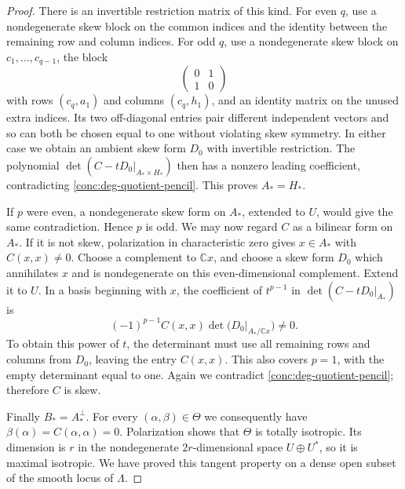 \begin{proof}
There is an invertible restriction matrix of this kind.  For
even \(q\), use a nondegenerate skew block on the common
indices and the identity between the remaining row and column
indices.  For odd \(q\), use a nondegenerate skew block on
\(c_1,\ldots,c_{q-1}\), the block
\[
 \begin{pmatrix}0&1\\1&0\end{pmatrix}
\]
with rows \((c_q,a_1)\) and columns \((c_q,h_1)\), and an
identity matrix on the unused extra indices.  Its two off-diagonal
entries pair different independent vectors and so can both be
chosen equal to one without violating skew symmetry.  In either
case we obtain an ambient skew form \(D_0\) with invertible
restriction.  The polynomial
\(\det(C-tD_0|_{A_*\times H_*})\) then has a nonzero leading
coefficient, contradicting \eqref{conc:deg-quotient-pencil}.
This proves \(A_*=H_*\).

If \(p\) were even, a nondegenerate skew form on \(A_*\),
extended to \(U\), would give the same contradiction.  Hence
\(p\) is odd.  We may now regard \(C\) as a bilinear form
on \(A_*\).  If it is not skew, polarization in characteristic
zero gives \(x\in A_*\) with \(C(x,x)\ne0\).
Choose a complement to \(\mathbb{C}x\), and choose a skew
form \(D_0\) which annihilates \(x\) and is nondegenerate
on this even-dimensional complement.  Extend it to \(U\).
In a basis beginning with \(x\), the coefficient of
\(t^{p-1}\) in \(\det(C-tD_0|_{A_*})\) is
\[
 (-1)^{p-1}C(x,x)
    \det\bigl(D_0|_{A_*/\mathbb{C}x}\bigr)\ne0.
\]
To obtain this power of \(t\), the determinant must use all
remaining rows and columns from \(D_0\), leaving the entry
\(C(x,x)\).  This also covers \(p=1\), with the empty
determinant equal to one.  Again we contradict
\eqref{conc:deg-quotient-pencil}; therefore \(C\) is skew.

Finally \(B_*=A_*^\perp\).  For every
\((\alpha,\beta)\in\Theta\) we consequently have
\(\beta(\alpha)=C(\alpha,\alpha)=0\).
Polarization shows that \(\Theta\) is totally isotropic.
Its dimension is \(r\) in the nondegenerate \(2r\)-dimensional
space \(U\oplus U^*\), so it is maximal isotropic.  We have
proved this tangent property on a dense open subset of the smooth
locus of \(\Lambda\).


\end{proof}

